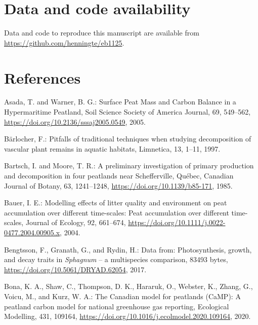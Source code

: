 \documentclass[
  12pt,
]{article}
\newlength{\cslhangindent}
\newlength{\cslentryspacingunit} %
\newenvironment{CSLReferences}[2] %
 {%
  \setlength{\parindent}{0pt}
  \ifodd #1
  \let\oldpar\par
  \def\par{\hangindent=\cslhangindent\oldpar}
  \fi
  \setlength{\parskip}{#2\cslentryspacingunit}
 }%
 {}
\begin{document}
\hypertarget{data-and-code-availability}{%
\section*{Data and code availability}\label{data-and-code-availability}}

Data and code to reproduce this manuscript are available from \url{https://github.com/henningte/eb1125}.

\hypertarget{references}{%
\section*{References}\label{references}}

\hypertarget{refs}{}
\begin{CSLReferences}{0}{0}
\leavevmode{}%
Asada, T. and Warner, B. G.: Surface {Peat Mass} and {Carbon Balance} in a {Hypermaritime Peatland}, Soil Science Society of America Journal, 69, 549--562, \url{https://doi.org/10.2136/sssaj2005.0549}, 2005.

\leavevmode{}%
Bärlocher, F.: Pitfalls of traditional techniques when studying decomposition of vascular plant remains in aquatic habitats, Limnetica, 13, 1--11, 1997.

\leavevmode{}%
Bartsch, I. and Moore, T. R.: A preliminary investigation of primary production and decomposition in four peatlands near {Schefferville}, {Qu{é}bec}, Canadian Journal of Botany, 63, 1241--1248, \url{https://doi.org/10.1139/b85-171}, 1985.

\leavevmode{}%
Bauer, I. E.: Modelling effects of litter quality and environment on peat accumulation over different time-scales: {Peat} accumulation over different time-scales, Journal of Ecology, 92, 661--674, \url{https://doi.org/10.1111/j.0022-0477.2004.00905.x}, 2004.

\leavevmode{}%
Bengtsson, F., Granath, G., and Rydin, H.: Data from: {Photosynthesis}, growth, and decay traits in {\emph{Sphagnum}} -- a multispecies comparison, 83493 bytes, \url{https://doi.org/10.5061/DRYAD.62054}, 2017.

\leavevmode{}%
Bona, K. A., Shaw, C., Thompson, D. K., Hararuk, O., Webster, K., Zhang, G., Voicu, M., and Kurz, W. A.: The {Canadian} model for peatlands ({CaMP}): {A} peatland carbon model for national greenhouse gas reporting, Ecological Modelling, 431, 109164, \url{https://doi.org/10.1016/j.ecolmodel.2020.109164}, 2020.


\end{CSLReferences}
\end{document}
